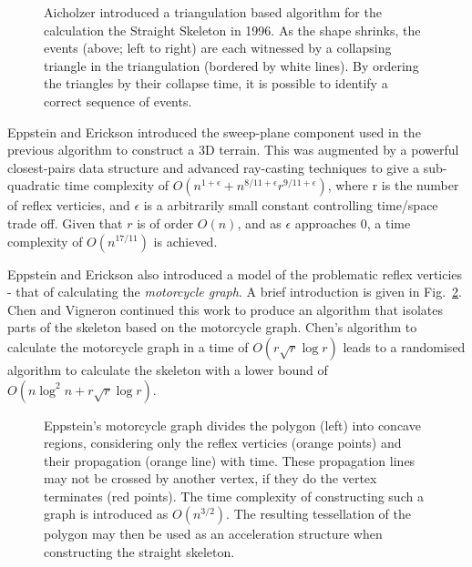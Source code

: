 \begin{figure}
  \centering
  \def\svgwidth{0.85\columnwidth}
  
  \caption[Aicholzer's triangulation algorithm]{\label{fig:skel_triangulation}Aicholzer introduced a triangulation based algorithm\cite{Aichholzer:1996:SKF} for the calculation the Straight Skeleton in 1996. As the shape shrinks, the events (above; left to right) are each witnessed by a collapsing triangle in the triangulation (bordered by white lines). By ordering the triangles by their collapse time, it is possible to identify a correct sequence of events.}
\end{figure}

Eppstein and Erickson\cite{Epp:98} introduced the sweep-plane component used in the previous algorithm to construct a 3D terrain. This was augmented by a powerful closest-pairs data structure and advanced ray-casting techniques to give a sub-quadratic time complexity of $O (
n^{1+\epsilon} + n ^{8/11+\epsilon} r ^{9/11 + \epsilon})$, where r is the number of reflex verticies, and $\epsilon$ is a arbitrarily small constant controlling time/space trade off. Given that $r$ is of order $O(n)$, and as $\epsilon$ approaches $0$, a time complexity of $O(n^{17/11})$ is achieved.

Eppstein and Erickson also introduced a model of the problematic reflex verticies - that of calculating the \emph{motorcycle graph}. A brief introduction is given in Fig.~\ref{fig:skel_motorcycle}. Chen and Vigneron\cite{Cheng02} continued this work to produce an algorithm that isolates parts of the skeleton based on the motorcycle graph. Chen's algorithm to calculate the motorcycle graph in a time of $O(r\sqrt{r}\log r)$ leads to a randomised algorithm to calculate the skeleton with a lower bound of $O(n \log^2 n + r\sqrt{r}\log r)$.

\begin{figure}
  \centering
  \def\svgwidth{0.85\columnwidth}
  
  \caption[Eppstein's Motorcycle Graphs]{\label{fig:skel_motorcycle}Eppstein's motorcycle\cite{Epp:98} graph divides the polygon (left) into concave regions, considering only the reflex verticies (orange points) and their propagation (orange line) with time. These propagation lines may not be crossed by another vertex, if they do the vertex terminates (red points). The time complexity of constructing such a graph is introduced as $O(n^{3/2})$. The resulting tessellation of the polygon may then be used as an acceleration structure when constructing the straight skeleton.}
\end{figure}

